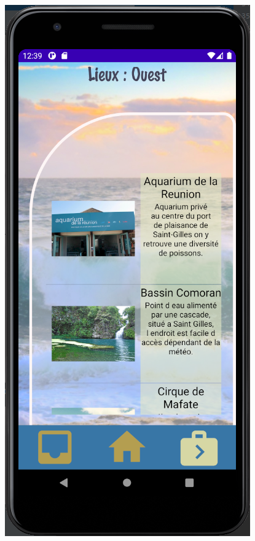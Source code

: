 \documentclass{article}
\begin{document}
\hfill
\begin{minipage}{0.23\textwidth}
\includegraphics[width=\textwidth]{Lieux_ouest}
\end{minipage}
\end{document}
